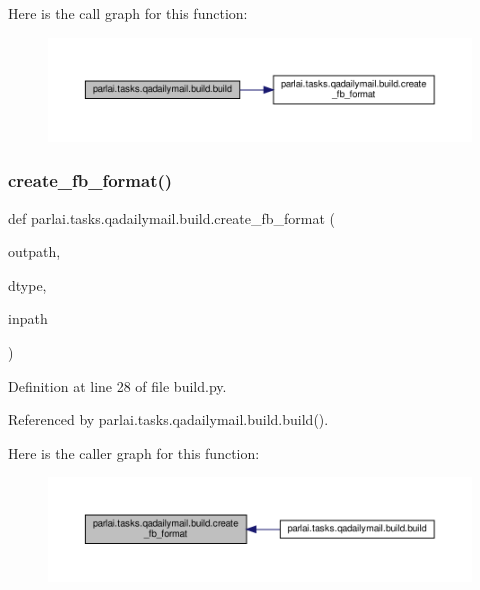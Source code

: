 Here is the call graph for this function\+:
\nopagebreak
\begin{figure}[H]
\begin{center}
\leavevmode
\includegraphics[width=350pt]{namespaceparlai_1_1tasks_1_1qadailymail_1_1build_ac5d9b858a94d4fe241cd57a6fd0ccf1c_cgraph}
\end{center}
\end{figure}
\mbox{\label{namespaceparlai_1_1tasks_1_1qadailymail_1_1build_a91296a105f8b2d3f5c53d34282cf6e62}} 
\subsubsection{\texorpdfstring{create\+\_\+fb\+\_\+format()}{create\_fb\_format()}}
{\footnotesize\ttfamily def parlai.\+tasks.\+qadailymail.\+build.\+create\+\_\+fb\+\_\+format (\begin{DoxyParamCaption}\item[{}]{outpath,  }\item[{}]{dtype,  }\item[{}]{inpath }\end{DoxyParamCaption})}



Definition at line 28 of file build.\+py.



Referenced by parlai.\+tasks.\+qadailymail.\+build.\+build().

Here is the caller graph for this function\+:
\nopagebreak
\begin{figure}[H]
\begin{center}
\leavevmode
\includegraphics[width=350pt]{namespaceparlai_1_1tasks_1_1qadailymail_1_1build_a91296a105f8b2d3f5c53d34282cf6e62_icgraph}
\end{center}
\end{figure}
